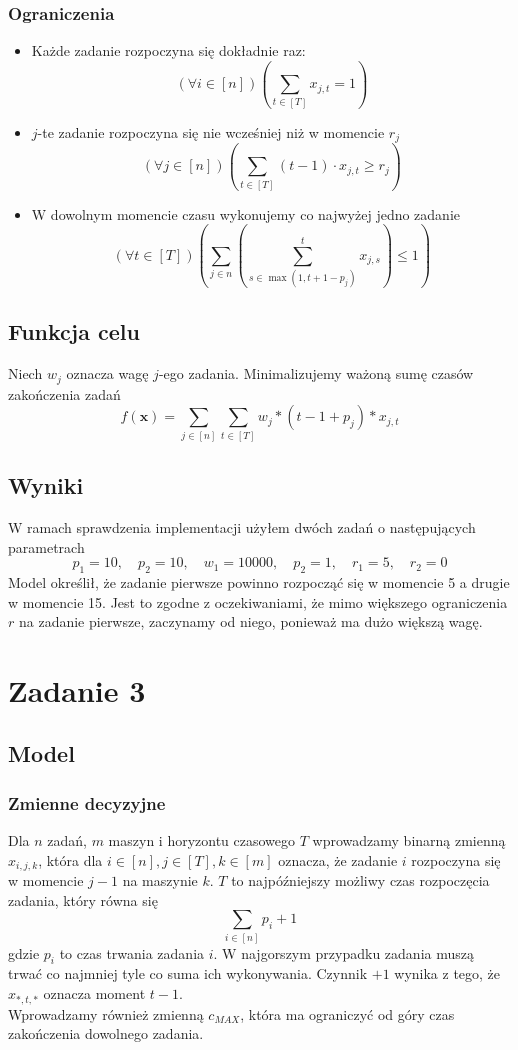 \documentclass{article}
\def\x{\textbf{x}}
\begin{document}
\subsubsection{Ograniczenia}
\begin{itemize}
\item Każde zadanie rozpoczyna się dokładnie raz:
$$(\forall i \in [n])\left(\sum_{t\in [T]}x_{j,t}=1\right)$$
\item $j$-te  zadanie rozpoczyna się nie wcześniej niż w momencie $r_j$
$$(\forall j \in [n])\left(\sum_{t\in [T]}(t-1)\cdot x_{j,t}\geq r_j\right)$$
\item W dowolnym momencie czasu wykonujemy co najwyżej jedno zadanie
$$(\forall t \in [T])\left(\sum_{j\in n} \left(\sum_{s\in \max(1, t+1-p_j)}^t x_{j,s} \right) \leq 1\right)$$
\end{itemize}

\subsection{Funkcja celu}
Niech $w_j$ oznacza wagę $j$-ego zadania. Minimalizujemy ważoną sumę czasów zakończenia zadań
$$f(\x)=\sum_{j \in [n]}\sum_{t\in[T]} w_j * (t-1+p_j) * x_{j,t}$$


\subsection{Wyniki}
W ramach sprawdzenia implementacji użyłem dwóch zadań o następujących parametrach
$$p_1=10,\quad p_2=10,\quad  w_1=10000,\quad  p_2=1,\quad  r_1=5,\quad  r_2=0$$
Model określił, że zadanie pierwsze powinno rozpocząć się w momencie 5 a drugie w momencie 15. Jest to zgodne z oczekiwaniami, że mimo większego ograniczenia $r$ na zadanie pierwsze, zaczynamy od niego, ponieważ ma dużo większą wagę.


\section{Zadanie 3}
\subsection{Model}
\subsubsection{Zmienne decyzyjne}
Dla $n$ zadań, $m$ maszyn i horyzontu czasowego $T$ wprowadzamy binarną zmienną $x_{i,j,k}$, która dla $i\in[n],j\in[T],k\in[m]$ oznacza, że zadanie $i$ rozpoczyna się w momencie $j-1$ na maszynie $k$. $T$ to najpóźniejszy możliwy czas rozpoczęcia zadania, który równa się
$$\sum_{i\in [n]} p_i + 1$$ 
gdzie $p_i$ to czas trwania zadania $i$. W najgorszym przypadku zadania muszą trwać co najmniej tyle co suma ich wykonywania. Czynnik $+1$ wynika z tego, że $x_{*,t,*}$ oznacza moment $t-1$.\\
Wprowadzamy również zmienną $c_{MAX}$, która ma ograniczyć od góry czas zakończenia dowolnego zadania.
\end{document}
